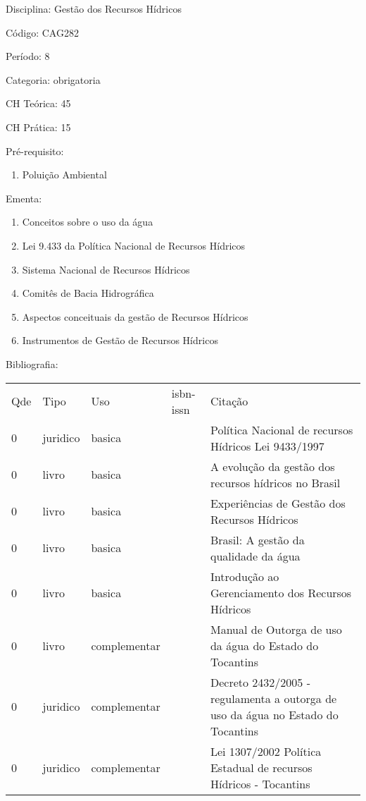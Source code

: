 \documentclass[12pt,a4paper,twoside]{report}
\begin{document}
Disciplina: Gestão dos Recursos Hídricos

Código: CAG282

Período: 8

Categoria: obrigatoria

CH Teórica: 45

CH Prática: 15




Pré-requisito:
\begin{enumerate}
\item Poluição Ambiental
\end{enumerate}

Ementa:
\begin{enumerate}
\item Conceitos sobre o uso da água
\item Lei 9.433 da Política Nacional de Recursos Hídricos
\item Sistema Nacional de Recursos Hídricos
\item Comitês de Bacia Hidrográfica
\item Aspectos conceituais da gestão de Recursos Hídricos
\item Instrumentos de Gestão de Recursos Hídricos
\end{enumerate}



Bibliografia:


\begin{tabular}{llllp{8cm}}
Qde & Tipo & Uso & isbn-issn & Citação \\
0&juridico&basica&&Política Nacional de recursos Hídricos Lei 9433/1997\\
0&livro&basica&&A evolução da gestão dos recursos hídricos no Brasil\\
0&livro&basica&&Experiências de Gestão dos Recursos Hídricos\\
0&livro&basica&&Brasil: A gestão da qualidade da água\\
0&livro&basica&&Introdução ao Gerenciamento dos Recursos Hídricos\\
0&livro&complementar&&Manual de Outorga de uso da água do Estado do Tocantins\\
0&juridico&complementar&&Decreto 2432/2005 - regulamenta a outorga de uso da água no Estado do Tocantins\\
0&juridico&complementar&&Lei 1307/2002 Política Estadual de recursos Hídricos - Tocantins\\
\end{tabular}
\end{document}
